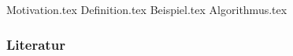 \documentclass[aspectratio=\BeamerAspectRatio]{beamer}
\begin{document}
\maketitlepage %
\makesectionpopup %

{Motivation.tex}
{Definition.tex}
{Beispiel.tex}
{Algorithmus.tex}

\begin{frame}[allowframebreaks]
    \frametitle{Literatur}
    \printbibliography
\end{frame}
\end{document}
